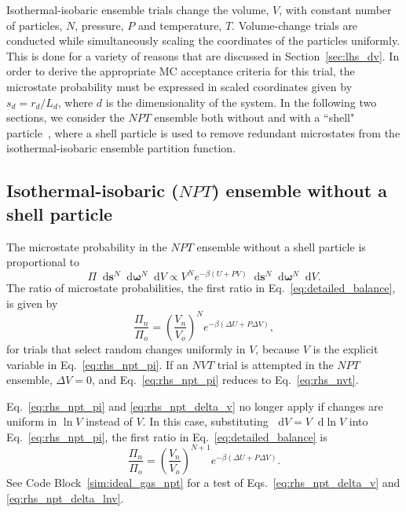 \documentclass[
  9pt,
  bestpractices,
  pubversion,
]{livecoms}
\newcommand*\diff{\mathop{}\!\mathrm{d}}
\begin{document}
Isothermal-isobaric ensemble trials change the volume, $V$, with constant number of particles, $N$, pressure, $P$ and temperature, $T$.
Volume-change trials are conducted while simultaneously scaling the coordinates of the particles uniformly.
This is done for a variety of reasons that are discussed in Section~\ref{sec:lhs_dv}.
In order to derive the appropriate MC acceptance criteria for this trial, the microstate probability must be expressed in scaled coordinates given by $s_d = r_d/L_d$, where $d$ is the dimensionality of the system.
In the following two sections, we consider the $NPT$ ensemble both without and with a ``shell" particle~\cite{koper_length_1996, corti_deriving_1998, hatch_theory_2024}, where a shell particle is used to remove redundant microstates from the isothermal-isobaric ensemble partition function.

\subsection{\label{sec:rhs_npt_shell}Isothermal-isobaric ($NPT$) ensemble without a shell particle}

The microstate probability in the $NPT$ ensemble without a shell particle is proportional to \cite{wood_monte_1968, allen_computer_1989, frenkel_understanding_2002}
\begin{equation}
\Pi \diff\mathbf{s}^{N}\diff\boldsymbol{\omega}^{N}\diff V \propto V^{N} e^{-\beta(U+P V)} \diff\mathbf{s}^{N} \diff\boldsymbol{\omega}^{N}\diff V.
\label{eq:rhs_npt_pi}
\end{equation}
The ratio of microstate probabilities, the first ratio in Eq.~\ref{eq:detailed_balance}, is given by
\begin{equation}
\frac{\Pi_n}{\Pi_o} = \left(\frac{V_n}{V_o}\right)^{N}e^{-\beta(\Delta U + P\Delta V)},
\label{eq:rhs_npt_delta_v}
\end{equation}
for trials that select random changes uniformly in $V$, because $V$ is the explicit variable in Eq.~\ref{eq:rhs_npt_pi}.
If an $NVT$ trial is attempted in the $NPT$ ensemble, $\Delta V=0$, and Eq.~\ref{eq:rhs_npt_pi} reduces to Eq.~\ref{eq:rhs_nvt}.

Eq.~\ref{eq:rhs_npt_pi} and \ref{eq:rhs_npt_delta_v} no longer apply if changes are uniform in $\ln V$ instead of $V$.
In this case, substituting $\diff V=V\diff\ln V$ into Eq.~\ref{eq:rhs_npt_pi}, the first ratio in Eq.~\ref{eq:detailed_balance} is
\begin{equation}
\frac{\Pi_n}{\Pi_o} = \left(\frac{V_n}{V_o}\right)^{N+1}e^{-\beta(\Delta U + P\Delta V)}.
\label{eq:rhs_npt_delta_lnv}
\end{equation}
See Code Block~\ref{sim:ideal_gas_npt} for a test of Eqs.~\ref{eq:rhs_npt_delta_v} and \ref{eq:rhs_npt_delta_lnv}.
\end{document}
